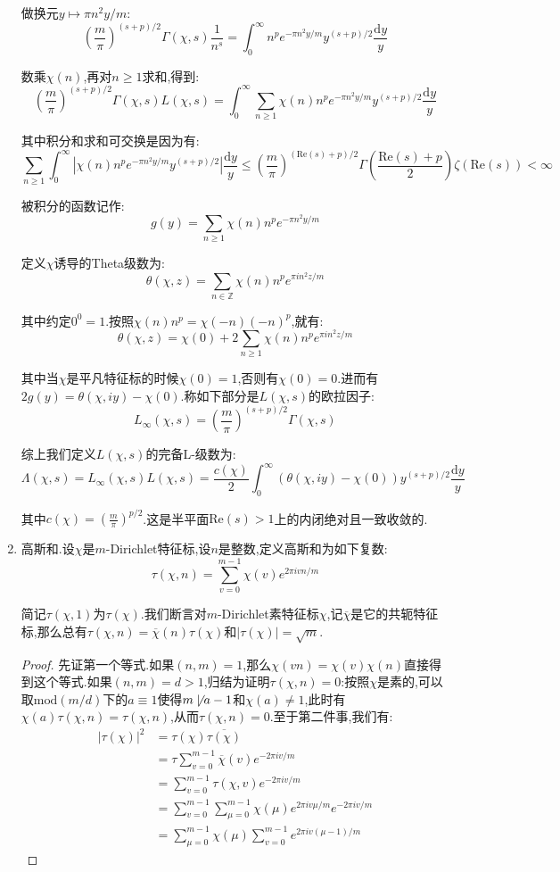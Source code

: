 \begin{enumerate}
    做换元$y\mapsto\pi n^2y/m$:
    $$\left(\frac{m}{\pi}\right)^{(s+p)/2}\Gamma(\chi,s)\frac{1}{n^s}=\int_0^{\infty}n^pe^{-\pi n^2y/m}y^{(s+p)/2}\frac{\mathrm{d}y}{y}$$
    
    数乘$\chi(n)$,再对$n\ge1$求和,得到:
    $$\left(\frac{m}{\pi}\right)^{(s+p)/2}\Gamma(\chi,s)L(\chi,s)=\int_0^{\infty}\sum_{n\ge1}\chi(n)n^pe^{-\pi n^2y/m}y^{(s+p)/2}\frac{\mathrm{d}y}{y}$$
    
    其中积分和求和可交换是因为有:
    $$\sum_{n\ge1}\int_0^{\infty}\left|\chi(n)n^pe^{-\pi n^2y/m}y^{(s+p)/2}\right|\frac{\mathrm{d}y}{y}\le\left(\frac{m}{\pi}\right)^{(\mathrm{Re}(s)+p)/2}\Gamma\left(\frac{\mathrm{Re}(s)+p}{2}\right)\zeta(\mathrm{Re}(s))<\infty$$
    
    被积分的函数记作:
    $$g(y)=\sum_{n\ge1}\chi(n)n^pe^{-\pi n^2y/m}$$
    
    定义$\chi$诱导的Theta级数为:
    $$\theta(\chi,z)=\sum_{n\in\mathbb{Z}}\chi(n)n^pe^{\pi in^2z/m}$$
    
    其中约定$0^0=1$.按照$\chi(n)n^p=\chi(-n)(-n)^p$,就有:
    $$\theta(\chi,z)=\chi(0)+2\sum_{n\ge1}\chi(n)n^pe^{\pi in^2z/m}$$
    
    其中当$\chi$是平凡特征标的时候$\chi(0)=1$,否则有$\chi(0)=0$.进而有$2g(y)=\theta(\chi,iy)-\chi(0)$.称如下部分是$L(\chi,s)$的欧拉因子:
    $$L_{\infty}(\chi,s)=\left(\frac{m}{\pi}\right)^{(s+p)/2}\Gamma(\chi,s)$$
    
    综上我们定义$L(\chi,s)$的完备L-级数为:
    $$\Lambda(\chi,s)=L_{\infty}(\chi,s)L(\chi,s)=\frac{c(\chi)}{2}\int_0^{\infty}\left(\theta(\chi,iy)-\chi(0)\right)y^{(s+p)/2}\frac{\mathrm{d}y}{y}$$
    
    其中$c(\chi)=\left(\frac{m}{\pi}\right)^{p/2}$.这是半平面$\mathrm{Re}(s)>1$上的内闭绝对且一致收敛的.
    \item 高斯和.设$\chi$是$m$-Dirichlet特征标,设$n$是整数,定义高斯和为如下复数:
    $$\tau(\chi,n)=\sum_{v=0}^{m-1}\chi(v)e^{2\pi ivn/m}$$
    
    简记$\tau(\chi,1)$为$\tau(\chi)$.我们断言对$m$-Dirichlet素特征标$\chi$,记$\overline{\chi}$是它的共轭特征标,那么总有$\tau(\chi,n)=\overline{\chi}(n)\tau(\chi)$和$|\tau(\chi)|=\sqrt{m}$.
    \begin{proof}
    	
    	先证第一个等式.如果$(n,m)=1$,那么$\chi(vn)=\chi(v)\chi(n)$直接得到这个等式.如果$(n,m)=d>1$,归结为证明$\tau(\chi,n)=0$:按照$\chi$是素的,可以取$\mathrm{mod}(m/d)$下的$a\equiv1$使得$m\not\mid a-1$和$\chi(a)\not=1$,此时有$\chi(a)\tau(\chi,n)=\tau(\chi,n)$,从而$\tau(\chi,n)=0$.至于第二件事,我们有:
    	\begin{align*}
    		\left|\tau(\chi)\right|^2&=\tau(\chi)\overline{\tau(\chi)}\\&=\tau\sum_{v=0}^{m-1}\overline{\chi}(v)e^{-2\pi iv/m}\\&=\sum_{v=0}^{m-1}\tau(\chi,v)e^{-2\pi iv/m}\\&=\sum_{v=0}^{m-1}\sum_{\mu=0}^{m-1}\chi(\mu)e^{2\pi iv\mu/m}e^{-2\pi iv/m}\\&=\sum_{\mu=0}^{m-1}\chi(\mu)\sum_{v=0}^{m-1}e^{2\pi iv(\mu-1)/m}
    	\end{align*}
    

\end{proof}
\end{enumerate}
